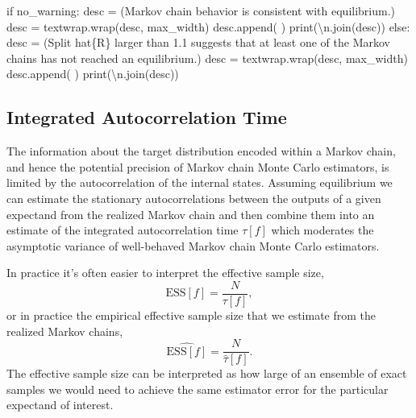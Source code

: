 \documentclass[
  letterpaper,
  DIV=11,
  numbers=noendperiod]{scrartcl}
\newenvironment{Shaded}{\begin{snugshade}}{\end{snugshade}}
\newcommand{\BuiltInTok}[1]{\textcolor[rgb]{0.00,0.23,0.31}{#1}}
\newcommand{\CharTok}[1]{\textcolor[rgb]{0.13,0.47,0.30}{#1}}
\newcommand{\ControlFlowTok}[1]{\textcolor[rgb]{0.00,0.23,0.31}{#1}}
\newcommand{\NormalTok}[1]{\textcolor[rgb]{0.00,0.23,0.31}{#1}}
\newcommand{\OperatorTok}[1]{\textcolor[rgb]{0.37,0.37,0.37}{#1}}
\newcommand{\SpecialCharTok}[1]{\textcolor[rgb]{0.37,0.37,0.37}{#1}}
\newcommand{\StringTok}[1]{\textcolor[rgb]{0.13,0.47,0.30}{#1}}
\begin{document}
\begin{Shaded}
\begin{Highlighting}[]
  \ControlFlowTok{if}\NormalTok{ no\_warning:}
\NormalTok{    desc }\OperatorTok{=}\NormalTok{ (}\StringTok{\textquotesingle{}Markov chain behavior is consistent with equilibrium.\textquotesingle{}}\NormalTok{)}
\NormalTok{    desc }\OperatorTok{=}\NormalTok{ textwrap.wrap(desc, max\_width)}
\NormalTok{    desc.append(}\StringTok{\textquotesingle{} \textquotesingle{}}\NormalTok{)}
    \BuiltInTok{print}\NormalTok{(}\StringTok{\textquotesingle{}}\CharTok{\textbackslash{}n}\StringTok{\textquotesingle{}}\NormalTok{.join(desc))}
  \ControlFlowTok{else}\NormalTok{:}
\NormalTok{    desc }\OperatorTok{=}\NormalTok{ (}\StringTok{\textquotesingle{}Split hat}\SpecialCharTok{\{R\}}\StringTok{ larger than 1.1 suggests that at least one \textquotesingle{}}
            \StringTok{\textquotesingle{}of the Markov chains has not reached an equilibrium.\textquotesingle{}}\NormalTok{)}
\NormalTok{    desc }\OperatorTok{=}\NormalTok{ textwrap.wrap(desc, max\_width)}
\NormalTok{    desc.append(}\StringTok{\textquotesingle{} \textquotesingle{}}\NormalTok{)}
    \BuiltInTok{print}\NormalTok{(}\StringTok{\textquotesingle{}}\CharTok{\textbackslash{}n}\StringTok{\textquotesingle{}}\NormalTok{.join(desc))}
\end{Highlighting}
\end{Shaded}

\hypertarget{integrated-autocorrelation-time}{%
\subsection{Integrated Autocorrelation
Time}\label{integrated-autocorrelation-time}}

The information about the target distribution encoded within a Markov
chain, and hence the potential precision of Markov chain Monte Carlo
estimators, is limited by the autocorrelation of the internal states.
Assuming equilibrium we can estimate the stationary autocorrelations
between the outputs of a given expectand from the realized Markov chain
and then combine them into an estimate of the integrated autocorrelation
time \(\tau[f]\) which moderates the asymptotic variance of well-behaved
Markov chain Monte Carlo estimators.

In practice it's often easier to interpret the effective sample size, \[
\text{ESS}[f] = \frac{N}{\tau[f]},
\] or in practice the empirical effective sample size that we estimate
from the realized Markov chains, \[
\hat{\text{ESS}[f]} = \frac{N}{\hat{\tau}[f]}.
\] The effective sample size can be interpreted as how large of an
ensemble of exact samples we would need to achieve the same estimator
error for the particular expectand of interest.
\end{document}
